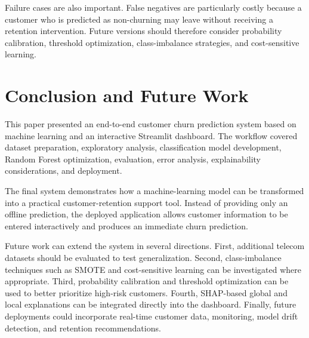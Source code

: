\documentclass[conference]{IEEEtran}
\begin{document}
Failure cases are also important. False negatives are particularly costly because a customer who is predicted as non-churning may leave without receiving a retention intervention. Future versions should therefore consider probability calibration, threshold optimization, class-imbalance strategies, and cost-sensitive learning.

\clearpage
\section{Conclusion and Future Work}
This paper presented an end-to-end customer churn prediction system based on machine learning and an interactive Streamlit dashboard. The workflow covered dataset preparation, exploratory analysis, classification model development, Random Forest optimization, evaluation, error analysis, explainability considerations, and deployment.

The final system demonstrates how a machine-learning model can be transformed into a practical customer-retention support tool. Instead of providing only an offline prediction, the deployed application allows customer information to be entered interactively and produces an immediate churn prediction.

Future work can extend the system in several directions. First, additional telecom datasets should be evaluated to test generalization. Second, class-imbalance techniques such as SMOTE and cost-sensitive learning can be investigated where appropriate. Third, probability calibration and threshold optimization can be used to better prioritize high-risk customers. Fourth, SHAP-based global and local explanations can be integrated directly into the dashboard. Finally, future deployments could incorporate real-time customer data, monitoring, model drift detection, and retention recommendations.
\end{document}
